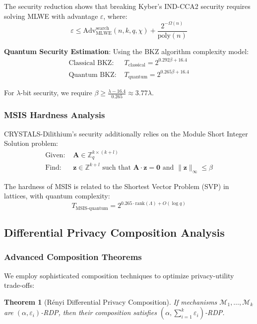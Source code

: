 \documentclass[journal,onecolumn,draftclsnofoot]{IEEEtran}
\newtheorem{theorem}{Theorem}
\begin{document}
The security reduction shows that breaking Kyber's IND-CCA2 security requires solving MLWE with advantage $\varepsilon$, where:
$$\varepsilon \leq \text{Adv}_{\text{MLWE}}^{\text{search}}(n, k, q, \chi) + \frac{2^{-\Omega(n)}}{\text{poly}(n)}$$

\textbf{Quantum Security Estimation}: Using the BKZ algorithm complexity model:
\begin{align}
\text{Classical BKZ: } &T_{\text{classical}} = 2^{0.292 \beta + 16.4} \\
\text{Quantum BKZ: } &T_{\text{quantum}} = 2^{0.265 \beta + 16.4}
\end{align}

For $\lambda$-bit security, we require $\beta \geq \frac{\lambda - 16.4}{0.265} \approx 3.77\lambda$.

\subsubsection{MSIS Hardness Analysis}

CRYSTALS-Dilithium's security additionally relies on the Module Short Integer Solution problem:
\begin{align}
\text{Given: } &\mathbf{A} \in \mathbb{Z}_q^{k \times (k+l)} \\
\text{Find: } &\mathbf{z} \in \mathbb{Z}^{k+l} \text{ such that } \mathbf{A} \cdot \mathbf{z} = \mathbf{0} \text{ and } \|\mathbf{z}\|_\infty \leq \beta
\end{align}

The hardness of MSIS is related to the Shortest Vector Problem (SVP) in lattices, with quantum complexity:
$$T_{\text{MSIS-quantum}} = 2^{0.265 \cdot \text{rank}(\Lambda) + O(\log q)}$$

\subsection{Differential Privacy Composition Analysis}

\subsubsection{Advanced Composition Theorems}

We employ sophisticated composition techniques to optimize privacy-utility trade-offs:

\begin{theorem}[Rényi Differential Privacy Composition]
If mechanisms $\mathcal{M}_1, \ldots, \mathcal{M}_k$ are $(\alpha, \varepsilon_i)$-RDP, then their composition satisfies $(\alpha, \sum_{i=1}^k \varepsilon_i)$-RDP.
\end{theorem}
\end{document}

